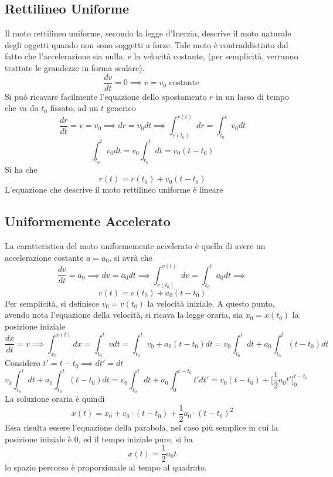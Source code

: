 \documentclass[10pt, letterpaper]{report}
\begin{document}
\subsection{Rettilineo Uniforme} 
Il moto rettilineo uniforme, secondo la legge d'Inerzia, descrive il moto naturale degli 
oggetti quando non sono soggetti a forze. Tale moto è contraddistinto dal fatto che 
l'accelerazione sia nulla, e la velocità costante, (per semplicità, verranno trattate 
le grandezze in forma scalare).
$$\frac{dv}{dt}=0\implies v = v_0 \text{ costante }$$
Si può ricavare facilmente l'equazione dello spostamento $r$ in un 
lasso di tempo che va da $t_0$ fissato, ad un $t$ generico
$$ \frac{dr}{dt}=v=v_0\implies dr=v_0dt\implies\int_{r(t_0)}^{r(t)}dr=\int_{t_0}^tv_0dt $$
$$\int_{t_0}^tv_0dt=v_0\int_{t_0}^tdt=v_0(t-t_0) $$
Si ha che  
$$ r(t)=r(t_0)+v_0(t-t_0)$$
L'equazione che descrive il moto rettilineo uniforme è lineare
\begin{center}
\end{center} 
\subsection{Uniformemente Accelerato}
La caratteristica del moto uniformemente accelerato è quella di avere un accelerazione costante 
$a = a_0 $, si avrà che 
$$ \frac{dv}{dt}=a_0\implies dv =a_0dt\implies \int_{v(t_0)}^{v(t)}dv=\int_{t_0}^ta_0dt\implies$$
$$v(t)=v(t_0)+a_0(t-t_0) $$
Per semplicità, si definisce $v_0=v(t_0)$ la velocità iniziale. A questo punto, avendo nota l'equazione 
della velocità, si ricava la legge oraria, sia $x_0=x(t_0)$ la posizione iniziale 
$$ \frac{dx}{dt}=v\implies \int_{x_0}^{x(t)}dx=\int_{t_0}^t vdt = \int_{t_0}^tv_0+a_0(t-t_0)dt= 
v_0\int_{t_0}^tdt+a_0\int_{t_0}^t(t-t_0)dt$$
Considero $t'=t-t_0\implies dt'=dt$ 
$$ v_0\int_{t_0}^tdt+a_0\int_{t_0}^t(t-t_0)dt= 
v_0\int_{t_0}^tdt+a_0\int_{0}^{t-t_0}t'dt'=v_0(t-t_0)+\Big[\dfrac{1}{2}a_0t'\Big]_0^{t-t_0}$$
La soluzione oraria è quindi 
$$ x(t)=x_0+v_0\cdot (t-t_0)+\frac{1}{2}a_0\cdot (t-t_0)^2$$
Essa risulta essere l'equazione della parabola, nel caso più semplice in cui la posizione 
iniziale è 0, ed il tempo iniziale pure, si ha  
$$ x(t)=\dfrac{1}{2}a_0t$$
lo spazio percorso è proporzionale al tempo al 
quadrato.
\end{document}
